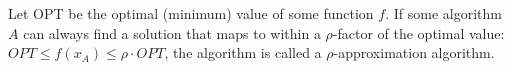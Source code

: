 
Let OPT be the optimal (minimum) value of some function \(f\). 
If some algorithm \(A\) can always find a solution that maps to within a \(\rho\)-factor of the optimal value: \(OPT \leq f(x_A) \leq \rho \cdot OPT\), the algorithm is called a \(\rho\)-approximation algorithm. 
